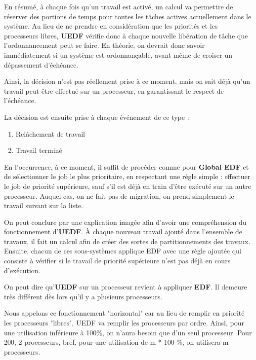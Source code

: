 		En résumé, à chaque fois qu'un travail est activé, un calcul va permettre 
		de réserver des portions de temps pour toutes les tâches actives 
		actuellement dans le système. Au lieu de ne prendre en considération que 
		les priorités et les processeurs libres, \textbf{UEDF }vérifie donc à 
		chaque nouvelle libération de tâche que l'ordonnancement peut se faire. 
		En théorie, on devrait donc savoir immédiatement si un système est ordonnançable, 
		avant même de croiser un dépassement d'échéance. 
		
		Ainsi, la décision n'est pas réellement prise à ce moment, 
		mais on sait déjà qu'un travail peut-être effectué sur un 
		processeur, en garantissant le respect de l'échéance.
		
		La décision est ensuite prise à chaque événement de ce type :
		\begin{enumerate}
			\item Relâchement de travail
			\item Travail terminé
		\end{enumerate}

		En l'occurrence, à ce moment, il suffit de procéder comme pour \textbf{Global EDF} et de sélectionner le job le plus prioritaire, en respectant 
		une règle simple : effectuer le job de priorité supérieure, sauf s'il 
		est déjà en train d'être exécuté sur un autre processeur. Auquel cas, on ne 
		fait pas de migration, on prend simplement le travail suivant sur la liste.\newline
		
		On peut conclure par une explication imagée afin d'avoir une compréhension du fonctionnement d'\textbf{UEDF}. À chaque nouveau travail ajouté dans l'ensemble de travaux, 
		il fait un calcul afin de créer des sortes de partitionnements des travaux. 
		Ensuite, chacun de ces sous-systèmes applique EDF avec une règle ajoutée qui consiste 
		à vérifier si le travail de priorité supérieure n'est pas déjà en cours d'exécution.
		
		On peut dire qu'\textbf{UEDF} sur un processeur revient à appliquer \textbf{EDF}. Il 
		demeure très différent dès lors qu'il y a plusieurs processeurs.
		
		
		
		Nous appelons ce fonctionnement "horizontal" car au lieu de remplir 
		en priorité les processeurs "libres", UEDF va remplir les 
		processeurs par ordre. Ainsi, pour une utilisation inférieure à 100\%, 
		on n'aura besoin que d'un seul processeur. Pour 200, 2 processeurs, bref, 
		pour une utilisation de m * 100 \%, on utilisera m processeurs.
		
